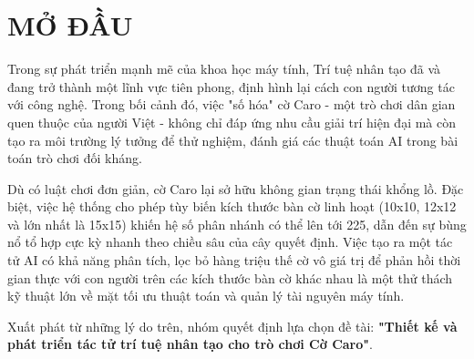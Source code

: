 
\chapter*{MỞ ĐẦU} %

\label{Chapter0} %


Trong sự phát triển mạnh mẽ của khoa học máy tính, Trí tuệ nhân tạo đã và đang trở thành một lĩnh vực tiên phong, định hình lại cách con người tương tác với công nghệ. Trong bối cảnh đó, việc "số hóa" cờ Caro - một trò chơi dân gian quen thuộc của người Việt - không chỉ đáp ứng nhu cầu giải trí hiện đại mà còn tạo ra môi trường lý tưởng để thử nghiệm, đánh giá các thuật toán AI trong bài toán trò chơi đối kháng. 

Dù có luật chơi đơn giản, cờ Caro lại sở hữu không gian trạng thái khổng lồ. Đặc biệt, việc hệ thống cho phép tùy biến kích thước bàn cờ linh hoạt (10x10, 12x12 và lớn nhất là 15x15) khiến hệ số phân nhánh có thể lên tới 225, dẫn đến sự bùng nổ tổ hợp cực kỳ nhanh theo chiều sâu của cây quyết định. Việc tạo ra một tác tử AI có khả năng phân tích, lọc bỏ hàng triệu thế cờ vô giá trị để phản hồi thời gian thực với con người trên các kích thước bàn cờ khác nhau là một thử thách kỹ thuật lớn về mặt tối ưu thuật toán và quản lý tài nguyên máy tính.

Xuất phát từ những lý do trên, nhóm quyết định lựa chọn đề tài: \textbf{"Thiết kế và phát triển tác tử trí tuệ nhân tạo cho trò chơi Cờ Caro"}. 

